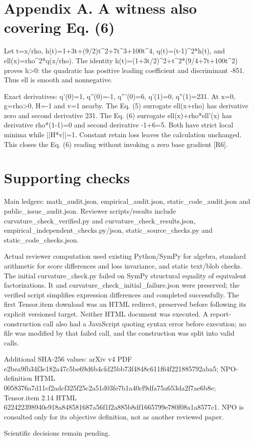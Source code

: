 \documentclass[10pt]{article}
\begin{document}
\section*{Appendix A. A witness also covering Eq. (6)}
Let t=x/rho, h(t)=1+3t+(9/2)t\textasciicircum{}2+7t\textasciicircum{}3+100t\textasciicircum{}4, q(t)=(t-1)\textasciicircum{}2*h(t), and ell(x)=rho\textasciicircum{}2*q(x/rho). The identity h(t)=(1+3t/2)\textasciicircum{}2+t\textasciicircum{}2*(9/4+7t+100t\textasciicircum{}2) proves h>0: the quadratic has positive leading coefficient and discriminant -851. Thus ell is smooth and nonnegative.\par
Exact derivatives: q’(0)=1, q”(0)=-1, q”’(0)=6, q’(1)=0, q”(1)=231. At x=0, g=rho>0, H=-1 and v=1 nearby. The Eq. (5) surrogate ell(x+rho) has derivative zero and second derivative 231. The Eq. (6) surrogate ell(x)+rho*ell’(x) has derivative rho*(1-1)=0 and second derivative -1+6=5. Both have strict local minima while ||H*v||=1. Constant retain loss leaves the calculation unchanged. This closes the Eq. (6) reading without invoking a zero base gradient [R6].\par
\section*{Supporting checks}
Main ledgers: math\_audit.json, empirical\_audit.json, static\_code\_audit.json and public\_issue\_audit.json. Reviewer scripts/results include curvature\_check\_verified.py and curvature\_check\_results.json, empirical\_independent\_checks.py/json, static\_source\_checks.py and static\_code\_checks.json.\par
Actual reviewer computation used existing Python/SymPy for algebra, standard arithmetic for score differences and loss invariance, and static text/blob checks. The initial curvature\_check.py failed on SymPy structural equality of equivalent factorizations. It and curvature\_check\_initial\_failure.json were preserved; the verified script simplifies expression differences and completed successfully. The first Tensor.item download was an HTML redirect, preserved before following its explicit versioned target. Neither HTML document was executed. A report-construction call also had a JavaScript quoting syntax error before execution; no file was modified by that failed call, and the construction was split into valid calls.\par
Additional SHA-256 values: arXiv v4 PDF e2bea9fb34f3e182a47c5be69d6b4cfd25bb73f4848c611f64f221885792aba5; NPO-definition HTML 0058376a7d11cf2adcf325f25c2a51d03fe7b1a40cf9dfa75a653da2f7ae6b8e; Tensor.item 2.14 HTML 622422398940e918a848581687a56f1f2a885b8df1665799e780f08a1a8577c1. NPO is consulted only for its objective definition, not as another reviewed paper.\par
Scientific decisions remain pending.\par
\end{document}
